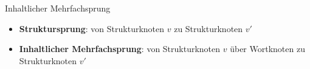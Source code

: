 
\begin{frame}{Inhaltlicher Mehrfachsprung}
    \begin{itemize}
        \item<1-> \textbf{Struktursprung}: von Strukturknoten $v$ zu Strukturknoten $v'$
        \item<2-> \textbf{Inhaltlicher Mehrfachsprung}: von Strukturknoten $v$ über Wortknoten zu Strukturknoten $v'$
    \end{itemize}
\end{frame}
